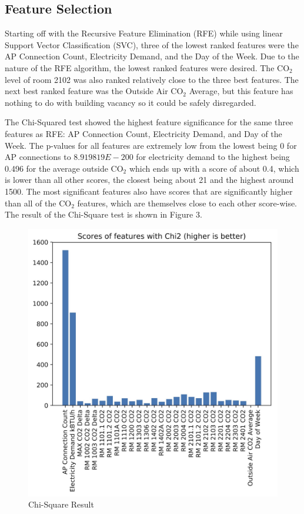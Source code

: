 \documentclass[letterpaper, 12 pt, conference]{ieeeconf}  %
\begin{document}
\subsection{Feature Selection}

Starting off with the Recursive Feature Elimination (RFE) while using linear Support Vector Classification (SVC), three of the lowest ranked features were the AP Connection Count, Electricity Demand, and the Day of the Week. Due to the nature of the RFE algorithm, the lowest ranked features were desired. The CO$_2$ level of room 2102 was also ranked relatively close to the  three best features. The next best ranked feature was the Outside Air CO$_2$ Average, but this feature has nothing to do with building vacancy so it could be safely disregarded.

The Chi-Squared test showed the highest feature significance for the same three features as RFE: AP Connection Count, Electricity Demand, and Day of the Week. The p-values for all features are extremely low from the lowest being 0 for AP connections to $8.919819E-200$ for electricity demand to the highest being 0.496 for the average outside CO$_2$ which ends up with a score of about 0.4, which is lower than all other scores, the closest being about 21 and the highest around 1500. The most significant features also have scores that are significantly higher than all of the CO$_2$ features, which are themselves close to each other score-wise. The result of the Chi-Square test is shown in Figure 3.

\begin{figure}[H]
        \caption{Chi-Square Result}
        \includegraphics[scale=0.16]{../figures/chi2.jpg}
\end{figure}
\end{document}
